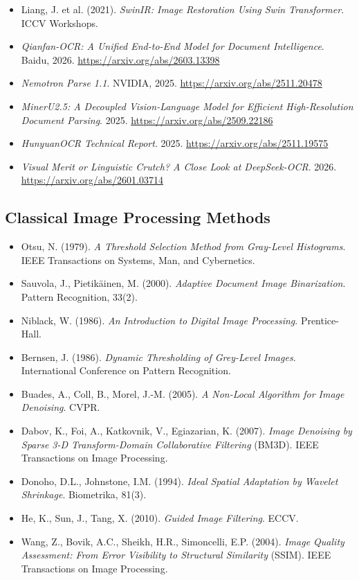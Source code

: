\documentclass[12pt, a4paper]{article}
\begin{document}
\begin{itemize}
  \item Liang, J. et al. (2021). \textit{SwinIR: Image Restoration Using Swin Transformer}. ICCV Workshops.
  \item \textit{Qianfan-OCR: A Unified End-to-End Model for Document Intelligence}. Baidu, 2026. \url{https://arxiv.org/abs/2603.13398}
  \item \textit{Nemotron Parse 1.1}. NVIDIA, 2025. \url{https://arxiv.org/abs/2511.20478}
  \item \textit{MinerU2.5: A Decoupled Vision-Language Model for Efficient High-Resolution Document Parsing}. 2025. \url{https://arxiv.org/abs/2509.22186}
  \item \textit{HunyuanOCR Technical Report}. 2025. \url{https://arxiv.org/abs/2511.19575}
  \item \textit{Visual Merit or Linguistic Crutch? A Close Look at DeepSeek-OCR}. 2026. \url{https://arxiv.org/abs/2601.03714}
\end{itemize}

\subsection*{Classical Image Processing Methods}
\begin{itemize}
  \item Otsu, N. (1979). \textit{A Threshold Selection Method from Gray-Level Histograms}. IEEE Transactions on Systems, Man, and Cybernetics.
  \item Sauvola, J., Pietikäinen, M. (2000). \textit{Adaptive Document Image Binarization}. Pattern Recognition, 33(2).
  \item Niblack, W. (1986). \textit{An Introduction to Digital Image Processing}. Prentice-Hall.
  \item Bernsen, J. (1986). \textit{Dynamic Thresholding of Grey-Level Images}. International Conference on Pattern Recognition.
  \item Buades, A., Coll, B., Morel, J.-M. (2005). \textit{A Non-Local Algorithm for Image Denoising}. CVPR.
  \item Dabov, K., Foi, A., Katkovnik, V., Egiazarian, K. (2007). \textit{Image Denoising by Sparse 3-D Transform-Domain Collaborative Filtering} (BM3D). IEEE Transactions on Image Processing.
  \item Donoho, D.L., Johnstone, I.M. (1994). \textit{Ideal Spatial Adaptation by Wavelet Shrinkage}. Biometrika, 81(3).
  \item He, K., Sun, J., Tang, X. (2010). \textit{Guided Image Filtering}. ECCV.
  \item Wang, Z., Bovik, A.C., Sheikh, H.R., Simoncelli, E.P. (2004). \textit{Image Quality Assessment: From Error Visibility to Structural Similarity} (SSIM). IEEE Transactions on Image Processing.
\end{itemize}
\end{document}
